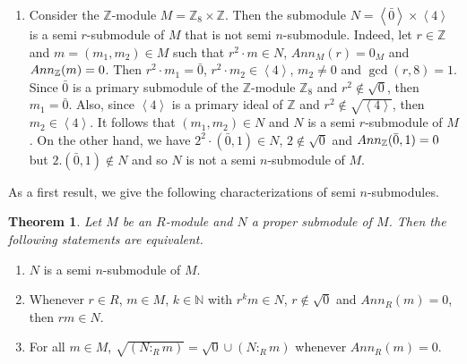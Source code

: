 \documentclass{amsart}%
\providecommand{\U}[1]{\protect\rule{.1in}{.1in}}
\newtheorem{theorem}{Theorem}
\theoremstyle{plain}
\numberwithin{equation}{section}
\begin{document}
\begin{enumerate}
\item Consider the $%
\mathbb{Z}
$-module $M=%
\mathbb{Z}
_{8}\times%
\mathbb{Z}
$. Then the submodule $N=\left\langle \bar{0}\right\rangle \times\left\langle
4\right\rangle $ is a semi $r$-submodule of $M$ that is not semi
$n$-submodule. Indeed, let $r\in%
\mathbb{Z}
$ and $m=(m_{1},m_{2})\in M$ such that $r^{2}\cdot m\in N$, $Ann_{M}(r)=0_{M}$
and $Ann_{%
\mathbb{Z}
}(m)=0$. Then $r^{2}\cdot m_{1}=\bar{0}$, $r^{2}\cdot m_{2}\in\left\langle
4\right\rangle $, $m_{2}\neq0$ and $\gcd(r,8)=1$. Since $\bar{0}$ is a primary
submodule of the $%
\mathbb{Z}
$-module $%
\mathbb{Z}
_{8}$ and $r^{2}\notin\sqrt{0}$, then $m_{1}=\bar{0}$. Also, since
$\left\langle 4\right\rangle $ is a primary ideal of $%
\mathbb{Z}
$ and $r^{2}\notin\sqrt{\left\langle 4\right\rangle }$, then $m_{2}%
\in\left\langle 4\right\rangle $. It follows that $(m_{1},m_{2})\in N$ and $N$
is a semi $r$-submodule of $M$. On the other hand, we have $2^{2}\cdot(\bar
{0},1)\in N$, $2\notin\sqrt{0}$ and $Ann_{%
\mathbb{Z}
}(\bar{0},1)=0$ but $2.(\bar{0},1)\notin N$ and so $N$ is not a semi
$n$-submodule of $M$.\ 
\end{enumerate}

As a first result, we give the following characterizations of semi $n$-submodules.

\begin{theorem}
\label{char1}Let $M$ be an $R$-module and $N$ a proper submodule of $M$. Then
the following statements are equivalent.
\end{theorem}

\begin{enumerate}
\item $N$ is a semi $n$-submodule of $M$.

\item Whenever $r\in R$, $m\in M$, $k\in%
\mathbb{N}
$ with $r^{k}m\in N$, $r\notin\sqrt{0}$ and $Ann_{R}(m)=0$, then $rm\in N$.

\item For all $m\in M$, $\sqrt{(N:_{R}m)}=\sqrt{0}\cup(N:_{R}m)$ whenever
$Ann_{R}(m)=0.$
\end{enumerate}
\end{document}
